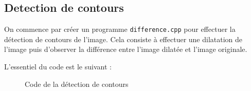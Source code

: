 \documentclass[french,a4paper,10pt]{article}
\begin{document}
	\subsection{Detection de contours}\label{subsec:4.1}

	On commence par créer un programme \texttt{difference.cpp} pour effectuer la détection de contours de l'image.
	Cela consiste à effectuer une dilatation de l'image puis d'observer la différence entre l'image dilatée et l'image
	originale.

	L'essentiel du code est le suivant : %
	\begin{figure}[!htb]
		\centering
		\caption{Code de la détection de contours}\label{Fig:difference-code}
	\end{figure}
\end{document}
